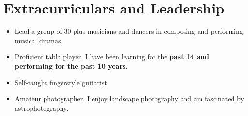 \documentclass{resume}
\begin{document}
\section{Extracurriculars and Leadership}
    \begin{itemize}\setlength{\itemsep}{0pt}\setlength{\parskip}{0pt}\vspace{0cm}
        \item Lead a group of 30 plus musicians and dancers in composing and performing musical dramas. 
    \end{itemize}
\begin{itemize}\setlength{\itemsep}{0pt}\setlength{\parskip}{0pt}\vspace{0cm}
    \item Proficient tabla player. I have been learning for the \textbf{past 14 and performing for the past 10 years.}
    \item Self-taught fingerstyle guitarist.
\end{itemize}
    \begin{itemize}\setlength{\itemsep}{0pt}\setlength{\parskip}{0pt}\vspace{-0.2cm}
        \item Amateur photographer. I enjoy landscape photography and am fascinated by astrophotography.
    \end{itemize}
\end{document}

